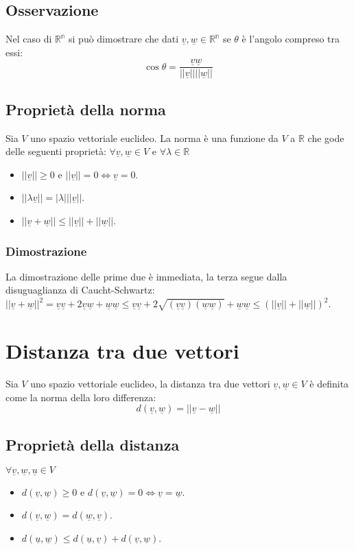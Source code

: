 \subsection{Osservazione}
Nel caso di $\mathbb{R^n}$ si pu\`o dimostrare che dati $\underline{v},\underline{w}\in\mathbb{R^n}$ se $\theta$ \`e l'angolo compreso tra essi:
\begin{equation}
\cos\theta=\dfrac{\underline{v}\underline{w}}{||\underline{v}||||\underline{w}||}
\end{equation}
\subsection{Propriet\`a della norma}
Sia $V$ uno spazio vettoriale euclideo. La norma \`e una funzione da $V$ a $\mathbb{R}$ che gode delle seguenti propriet\`a: $\forall\underline{v},\underline{w}\in V$ e $\forall
\lambda\in\mathbb{R}$
\begin{itemize}
\item $||\underline{v}||\ge 0$ e $||\underline{v}||=0\Leftrightarrow\underline{v}=0$.
\item $||\lambda\underline{v}||=|\lambda|||\underline{v}||$.
\item $||\underline{v}+\underline{w}||\le ||\underline{v}||+||\underline{w}||$.
\end{itemize}
\subsubsection{Dimostrazione}
La dimostrazione delle prime due \`e immediata, la terza segue dalla disuguaglianza di Caucht-Schwartz: $||\underline{v}+\underline{w}||^2=\underline{v}\underline{v}
+2\underline{v}\underline{w}+\underline{w}\underline{w}\le \underline{v}\underline{v}+2\sqrt{(\underline{v}\underline{v})(\underline{w}\underline{w})}+\underline{w}\underline{w}
\le (||\underline{v}||+||\underline{w}||)^2$.
\section{Distanza tra due vettori}
Sia $V$ uno spazio vettoriale euclideo, la distanza tra due vettori $\underline{v},\underline{w}\in V$ \`e definita come la norma della loro differenza:
\begin{equation}
d(\underline{v},\underline{w})=||\underline{v}-\underline{w}||
\end{equation}
\subsection{Propriet\`a della distanza}
$\forall \underline{v},\underline{w},\underline{u}\in V$
\begin{itemize}
\item $d(\underline{v},\underline{w})\ge 0$ e $d(\underline{v},\underline{w})=0\Leftrightarrow \underline{v}=\underline{w}$.
\item $d(\underline{v},\underline{w})=d(\underline{w},\underline{v})$.
\item $d(\underline{u},\underline{w})\le d(\underline{u},\underline{v})+d(\underline{v},\underline{w})$.
\end{itemize}

